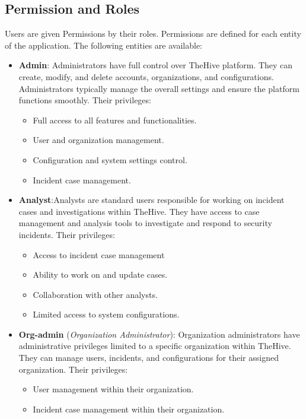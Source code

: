 \documentclass{book}
\begin{document}
\subsection{Permission and Roles}
Users are given Permissions by their roles. Permissions are defined for each entity of the application.
The following entities are available:
\begin{itemize}
    \item \textbf{Admin}: Administrators have full control over TheHive platform. They can create, modify, and delete accounts, organizations, and configurations. Administrators typically manage the overall settings and ensure the platform functions smoothly. Their privileges:
        \begin{itemize}
            \item Full access to all features and functionalities.
            \item User and organization management.
            \item Configuration and system settings control.
            \item Incident case management.
        \end{itemize}
    \item \textbf{Analyst}:Analysts are standard users responsible for working on incident cases and investigations within TheHive. They have access to case management and analysis tools to investigate and respond to security incidents. Their privileges:
        \begin{itemize}
            \item Access to incident case management
            \item Ability to work on and update cases.
            \item Collaboration with other analysts.
            \item Limited access to system configurations.
        \end{itemize}
    \item \textbf{Org-admin} (\textit{Organization Administrator}): Organization administrators have administrative privileges limited to a specific organization within TheHive. They can manage users, incidents, and configurations for their assigned organization. Their privileges:
        \begin{itemize}
            \item User management within their organization.
            \item Incident case management within their organization.

\end{itemize}
\end{itemize}
\end{document}
